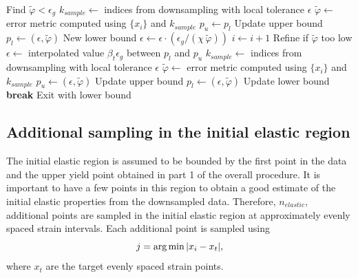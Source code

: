 \documentclass[a4paper,11pt]{article}
\begin{document}
\begin{algorithm}
\begin{algorithmic}[1]
            \Comment Find $\tilde{\varphi} < \epsilon_g$
            \State $k_{sample} \gets$ indices from downsampling with local tolerance $\epsilon$
            \State $\tilde{\varphi} \gets$ error metric computed using $\{x_i\}$ and $k_{sample}$
            \State $p_u \gets p_l$
            \Comment Update upper bound
            \State $p_l \gets (\epsilon, \tilde{\varphi})$
            \Comment New lower bound
            \State $\epsilon \gets \epsilon \cdot (\epsilon_g / (\chi \, \tilde{\varphi}))$
            \State $i \gets i + 1$
		\EndWhile
            \Comment Refine if $\tilde{\varphi}$ too low
            \State $\epsilon \gets$ interpolated value $\beta_t \epsilon_g$ between $p_l$ and $p_u$
            \State $k_{sample} \gets$ indices from downsampling with local tolerance $\epsilon$
            \State $\tilde{\varphi} \gets$ error metric computed using $\{x_i\}$ and $k_{sample}$
                \State $p_u \gets (\epsilon, \tilde{\varphi})$
                \Comment Update upper bound
            \Else
                \State $p_l \gets (\epsilon, \tilde{\varphi})$
                \Comment Update lower bound
            \EndIf
                \State \textbf{break}
                \Comment Exit with lower bound
            \EndIf
        \EndWhile
\end{algorithmic}
\end{algorithm}

\subsection{Additional sampling in the initial elastic region}

The initial elastic region is assumed to be bounded by the first point in the data and the upper yield point obtained in part 1 of the overall procedure.
It is important to have a few points in this region to obtain a good estimate of the initial elastic properties from the downsampled data.
Therefore, $n_{elastic}$, additional points are sampled in the initial elastic region at approximately evenly spaced strain intervals.
Each additional point is sampled using
\begin{equation}
    j = \arg \min \abs{x_i - x_{t}},
\end{equation}
where $x_t$ are the target evenly spaced strain points.
\end{document}
